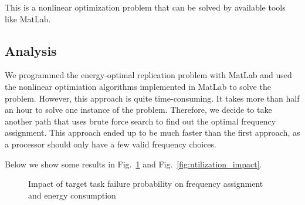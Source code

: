 This is a nonlinear optimization problem that can be solved by available tools like MatLab. 

\subsection{Analysis}
We programmed the energy-optimal replication problem with MatLab and used the nonlinear optimiation algorithms implemented in MatLab to solve the problem. However, this approach is quite time-consuming. It takes more than half an hour to solve one instance of the problem. Therefore, we decide to take another path that uses brute force search to find out the optimal frequency assignment. This approach ended up to be much faster than the first approach, as a processor should only have a few valid frequency choices. 

Below we show some results in Fig.~\ref{fig:failure_impact} and Fig.~\ref{fig:utilization_impact}.  

\begin{figure}[!t]
	\begin{center}
	\end{center}
	\caption{Impact of target task failure probability on frequency assignment and energy consumption}
	\label{fig:failure_impact}
\end{figure}

